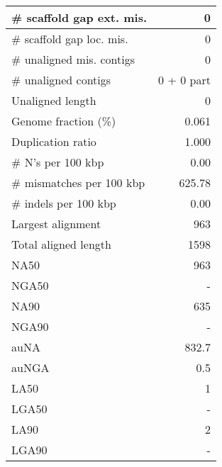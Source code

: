 \documentclass[12pt,a4paper]{article}
\begin{document}
\begin{table}[ht]
\begin{center}
\begin{tabular}{|l*{1}{|r}|}
\# scaffold gap ext. mis. & 0 \\ \hline
\# scaffold gap loc. mis. & 0 \\ \hline
\# unaligned mis. contigs & 0 \\ \hline
\# unaligned contigs & 0 + 0 part \\ \hline
Unaligned length & 0 \\ \hline
Genome fraction (\%) & 0.061 \\ \hline
Duplication ratio & 1.000 \\ \hline
\# N's per 100 kbp & 0.00 \\ \hline
\# mismatches per 100 kbp & 625.78 \\ \hline
\# indels per 100 kbp & 0.00 \\ \hline
Largest alignment & 963 \\ \hline
Total aligned length & 1598 \\ \hline
NA50 & 963 \\ \hline
NGA50 & - \\ \hline
NA90 & 635 \\ \hline
NGA90 & - \\ \hline
auNA & 832.7 \\ \hline
auNGA & 0.5 \\ \hline
LA50 & 1 \\ \hline
LGA50 & - \\ \hline
LA90 & 2 \\ \hline
LGA90 & - \\ \hline
\end{tabular}
\end{center}
\end{table}
\end{document}
